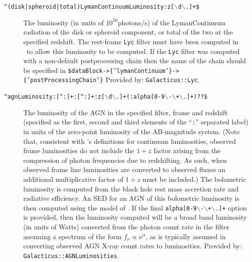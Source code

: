 \begin{description}
 \item[{\tt \textasciicircum(disk|spheroid|total)LymanContinuumLuminosity:z[$\backslash$d$\backslash$.]+\$}] The luminosity (in units of $10^{50}$photons/s) of the \gls{LymanContinuum} radiation of the disk or spheroid component, or total of the two at the specified redshift. The rest-frame {\tt Lyc} filter must have been computed in \glc\ to allow this luminosity to be computed. If the {\tt Lyc} filter was computed with a non-default postprocessing chain then the name of the chain should be specified in {\tt \$dataBlock-\textgreater\{'lymanContinuum'\}-\textgreater\{'postProcessingChain'\}} Provided by: {\tt Galacticus::Lyc}.
 \item[{\tt \textasciicircum agnLuminosity:[\textasciicircum:]+:[\textasciicircum:]+:z[$\backslash$d$\backslash$.]+(:alpha[0-9$\backslash$-$\backslash$+$\backslash$.]+)??\$}] The luminosity of the AGN in the specified filter, frame and redshift (specified as the first, second and third elements of the ``{\tt :}'' separated label) in units of the zero-point luminosity of the AB-magnitude system. (Note that, consistent with \glc's definitions for continuum luminosities, observed frame luminosities do not include the $1+z$ factor arising from the compression of photon frequencies due to redshifting. As such, when observed frame line luminosities are converted to observed fluxes an additional multiplicative factor of $1+z$ must be included.) The bolometric luminosity is computed from the black hole rest mass accretion rate and radiative efficiency. An SED for an AGN of this bolometric luminosity is then computed using the model of \cite{hopkins_observational_2007}. If the final {\tt alpha[0-9$\backslash$-$\backslash$+$\backslash$.]+} option is provided, then the luminosity computed will be a broad band luminosity (in units of Watts) converted from the photon count rate in the filter assuming a spectrum of the form $f_\nu \propto \nu^\alpha$, as is typically assumed in converting observed AGN X-ray count rates to luminosities. Provided by: {\tt Galacticus::AGNLuminosities}.



\end{description}

